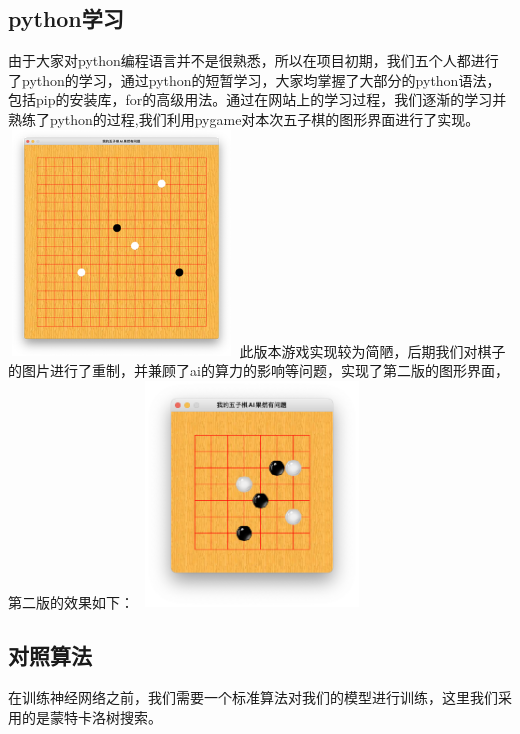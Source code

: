 \documentclass[a4paper]{article}
\begin{document}
\begin{multicols}{2}
  \subsection{python学习}
  由于大家对python编程语言并不是很熟悉，所以在项目初期，我们五个人都进行了python的学习\cite{ref3}，通过python的短暂学习，大家均掌握了大部分的python语法，包括pip的安装库，for的高级用法。通过在网站上的学习过程，我们逐渐的学习并熟练了python的过程,我们利用pygame对本次五子棋的图形界面进行了实现。
  \includegraphics[width=6cm,height=6cm]{gamepic.png}
  此版本游戏实现较为简陋，后期我们对棋子的图片进行了重制，并兼顾了ai的算力的影响等问题，实现了第二版的图形界面，第二版的效果如下：
  \includegraphics[width=6cm,height=6cm]{game.png}
  \subsection{对照算法}
在训练神经网络之前，我们需要一个标准算法对我们的模型进行训练，这里我们采用的是蒙特卡洛树搜索。

\end{multicols}
\end{document}
